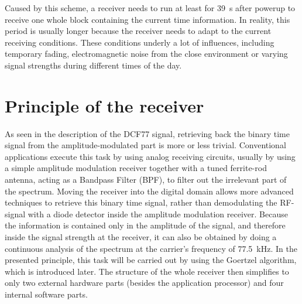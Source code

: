 \documentclass[conference]{IEEEtran}
\begin{document}
\FloatBarrier\noindent
Caused by this scheme, a receiver needs to run at least for \SI{39}{\second} after powerup to receive one whole block containing the current time information.
In reality, this period is usually longer because the receiver needs to adapt to the current receiving conditions. 
These conditions underly a lot of influences, including temporary fading, electromagnetic noise from the close environment or varying signal strengths
during different times of the day.

\section{Principle of the receiver}
As seen in the description of the DCF77 signal, retrieving back the binary time signal from the amplitude-modulated part is more or less trivial.
Conventional applications execute this task by using analog receiving circuits, usually by using a simple amplitude modulation receiver together with a
tuned ferrite-rod antenna, acting as a Bandpass Filter (BPF), to filter out the irrelevant part of the spectrum. 
Moving the receiver into the digital domain allows more advanced techniques to retrieve this binary time signal, rather than demodulating the RF-signal with a
diode detector inside the amplitude modulation receiver.
Because the information is contained only in the amplitude of the signal, and therefore inside the signal strength at the receiver, it can also be obtained by doing a
continuous analysis of the spectrum at the carrier's frequency of \SI{77.5}{\kilo\hertz}.
In the presented principle, this task will be carried out by using the Goertzel algorithm, which is introduced later.
The structure of the whole receiver then simplifies to only two external hardware parts
(besides the application processor) and four internal software parts.
\end{document}
